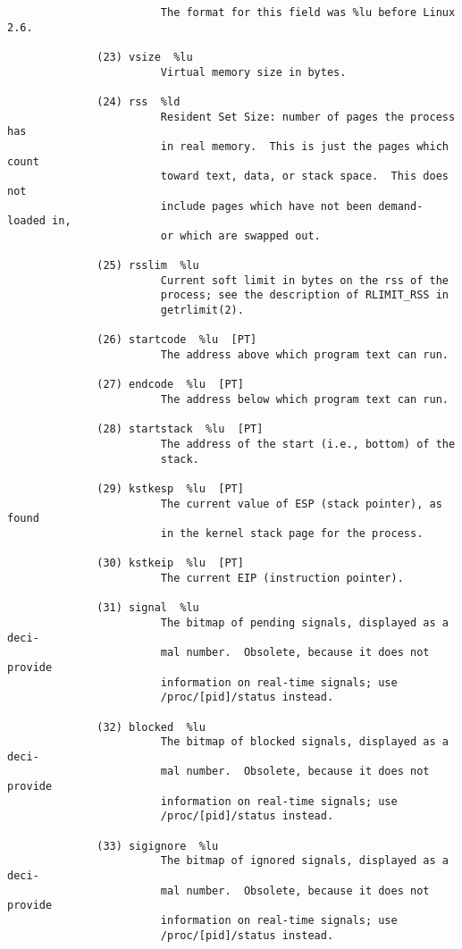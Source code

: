 \documentclass[]{article}
\begin{document}
\begin{verbatim}
                        The format for this field was %lu before Linux 2.6.

              (23) vsize  %lu
                        Virtual memory size in bytes.

              (24) rss  %ld
                        Resident Set Size: number of pages the process has
                        in real memory.  This is just the pages which count
                        toward text, data, or stack space.  This does not
                        include pages which have not been demand-loaded in,
                        or which are swapped out.

              (25) rsslim  %lu
                        Current soft limit in bytes on the rss of the
                        process; see the description of RLIMIT_RSS in
                        getrlimit(2).

              (26) startcode  %lu  [PT]
                        The address above which program text can run.

              (27) endcode  %lu  [PT]
                        The address below which program text can run.

              (28) startstack  %lu  [PT]
                        The address of the start (i.e., bottom) of the
                        stack.

              (29) kstkesp  %lu  [PT]
                        The current value of ESP (stack pointer), as found
                        in the kernel stack page for the process.

              (30) kstkeip  %lu  [PT]
                        The current EIP (instruction pointer).

              (31) signal  %lu
                        The bitmap of pending signals, displayed as a deci‐
                        mal number.  Obsolete, because it does not provide
                        information on real-time signals; use
                        /proc/[pid]/status instead.

              (32) blocked  %lu
                        The bitmap of blocked signals, displayed as a deci‐
                        mal number.  Obsolete, because it does not provide
                        information on real-time signals; use
                        /proc/[pid]/status instead.

              (33) sigignore  %lu
                        The bitmap of ignored signals, displayed as a deci‐
                        mal number.  Obsolete, because it does not provide
                        information on real-time signals; use
                        /proc/[pid]/status instead.


\end{verbatim}
\end{document}
